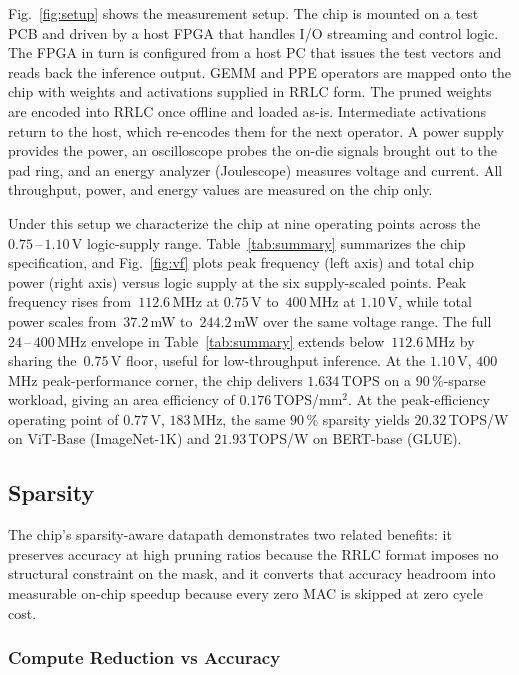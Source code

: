 \documentclass[lettersize,journal]{IEEEtran}
\begin{document}
Fig.~\ref{fig:setup} shows the measurement setup. The chip is mounted on a test PCB and driven by a host FPGA that handles I/O streaming and control logic. The FPGA in turn is configured from a host PC that issues the test vectors and reads back the inference output. GEMM and PPE operators are mapped onto the chip with weights and activations supplied in RRLC form. The pruned weights are encoded into RRLC once offline and loaded as-is. Intermediate activations return to the host, which re-encodes them for the next operator. A power supply provides the power, an oscilloscope probes the on-die signals brought out to the pad ring, and an energy analyzer (Joulescope) measures voltage and current. All throughput, power, and energy values are measured on the chip only.

Under this setup we characterize the chip at nine operating points across the~$0.75$\,--\,$1.10$\,V logic-supply range. Table~\ref{tab:summary} summarizes the chip specification, and Fig.~\ref{fig:vf} plots peak frequency (left axis) and total chip power (right axis) versus logic supply at the six supply-scaled points. Peak frequency rises from~$112.6$\,MHz at $0.75$\,V to~$400$\,MHz at $1.10$\,V, while total power scales from~$37.2$\,mW to~$244.2$\,mW over the same voltage range. The full~$24$\,--\,$400$\,MHz envelope in Table~\ref{tab:summary} extends below~$112.6$\,MHz by sharing the~$0.75$\,V floor, useful for low-throughput inference. At the $1.10$\,V, $400$\,MHz peak-performance corner, the chip delivers $1.634$\,TOPS on a $90\,\%$-sparse workload, giving an area efficiency of $0.176$\,TOPS/mm$^{2}$. At the peak-efficiency operating point of $0.77$\,V, $183$\,MHz, the same $90\,\%$ sparsity yields $20.32$\,TOPS/W on ViT-Base (ImageNet-1K) and $21.93$\,TOPS/W on BERT-base (GLUE).

\subsection{Sparsity}
\label{sec:results-sparsity}

The chip's sparsity-aware datapath demonstrates two related benefits: it preserves accuracy at high pruning ratios because the RRLC format imposes no structural constraint on the mask, and it converts that accuracy headroom into measurable on-chip speedup because every zero MAC is skipped at zero cycle cost. %

\subsubsection{Compute Reduction vs Accuracy}
\label{sec:results-sparsity-acc}
\end{document}
